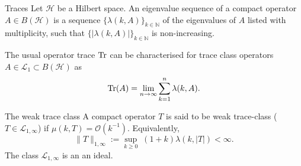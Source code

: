 \documentclass{beamer}
\numberwithin{equation}{section}
\theoremstyle{plain}
\theoremstyle{plain}
\theoremstyle{definition}
\theoremstyle{plain}
\theoremstyle{plain}
\theoremstyle{definition}
\newcommand{\abs}[1]{\left|#1\right|}
\newcommand{\tr}{{\rm Tr}}
\begin{document}
\begin{frame}{Traces}
    Let $\mathcal{H}$ be a Hilbert space. An eigenvalue sequence of a compact operator $A\in B(\mathcal{H})$ is a sequence $\{\lambda(k,A)\}_{k\in \mathbb{N}}$ of the eigenvalues of $A$ listed with multiplicity, such that $\{\abs{\lambda(k,A)}\}_{k\in \mathbb{N}}$ is non-increasing.
    \bigskip
    
    The usual operator trace $\tr$ can be characterised for trace class operators $A\in \mathcal{L}_1 \subset B(\mathcal{H})$ as \[\tr(A) = \lim_{n\to \infty} \sum_{k=1}^n \lambda(k,A). \] 
\end{frame}
% 
% 
%     
%     
% 
%     
\begin{frame}{The weak trace class}
    A compact operator $T$ is said to be weak trace-class ($T \in \mathcal{L}_{1,\infty}$) if $\mu(k,T) = \mathcal{O}(k^{-1})$. Equivalently,
    $$
        \|T\|_{1,\infty} := \sup_{k\geq 0}\;(1+k)\lambda(k,|T|) < \infty.
    $$
    The class $\mathcal{L}_{1,\infty}$ is an an ideal.    
\end{frame}
\end{document}
